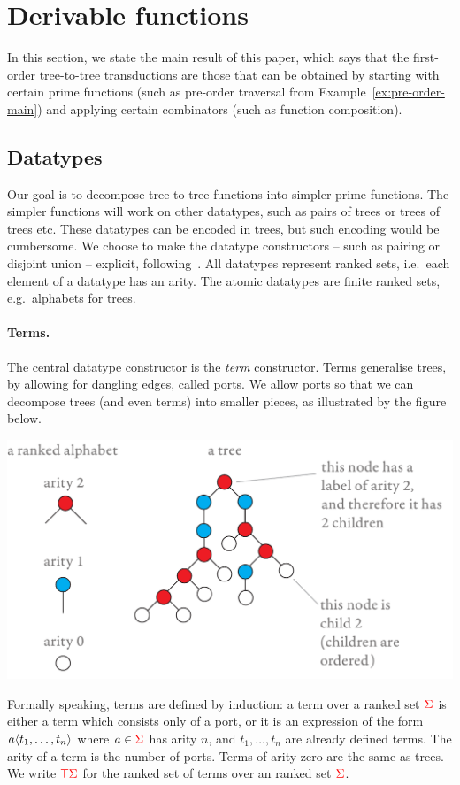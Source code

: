 \section{Derivable functions}\label{sec:derivable-functions}
In this section, we state the main result of this paper, which says that the  first-order tree-to-tree transductions are those that  can be  obtained by starting with certain prime functions (such as pre-order traversal from Example~\ref{ex:pre-order-main}) and applying certain  combinators (such as function composition). 

\subsection{Datatypes}
\label{sec:datatype-constructors}
 Our goal is to decompose tree-to-tree functions into simpler prime functions. The simpler  functions will work on other datatypes, such as pairs of trees or trees of trees etc. These datatypes  can be encoded in trees, but such encoding would be cumbersome. We choose to make the datatype constructors -- such as pairing or disjoint union --  explicit,  following~\cite{bojanczykRegularFirstOrderList2018}.
All datatypes represent ranked sets, i.e.~each element of a datatype has an arity. The atomic datatypes are finite ranked sets, e.g.~alphabets for trees. 

\paragraph*{Terms.} The central datatype constructor is the  \emph{term} constructor. Terms generalise trees, by allowing for dangling edges, called ports. We allow ports so that we can decompose trees (and even terms) into smaller pieces, as  illustrated by the figure below. 
\begin{center}
\includegraphics[scale=.32, page=15]{pics.pdf}
\end{center}
Formally speaking, terms are defined by induction: a term over a  ranked set ${\color{red}{\Sigma}}$ is either a term which consists only of a port, 
or it is an expression of the  form $a \langle{t_1,\ldots,t_n}\rangle$ where $a \in {\color{red}{\Sigma}}$ has arity $n$, and $t_1,\ldots,t_n$ are already defined terms. The arity of a term is the number of ports. Terms of arity zero are the same as trees. We write ${\color{red}{\mathsf T}} {\color{red}{\Sigma}}$ for the ranked set of terms over an ranked set ${\color{red}{\Sigma}}$.    

